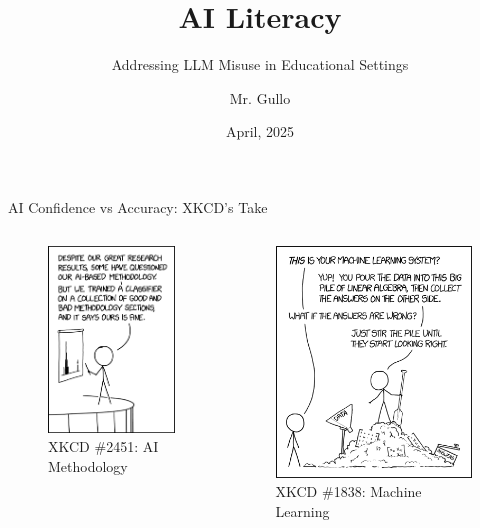 \documentclass{beamer}
\title[Critical AI Literacy]{AI Literacy}
\subtitle{Addressing LLM Misuse in Educational Settings}
\author[Mr. Gullo]{Mr. Gullo}
\date[April 2025]{April, 2025} %
\begin{document}
\begin{frame}
\titlepage
\end{frame}

\begin{frame}{AI Confidence vs Accuracy: XKCD's Take}
  \begin{columns}
    \begin{column}{0.48\textwidth}
     \begin{figure}
        \centering
        \includegraphics[width=0.6\linewidth]{cs12-ai-methodology.png}
     \caption*{XKCD \#2451: AI Methodology}
      \end{figure}
    \end{column}
    \begin{column}{0.48\textwidth}
      \begin{figure}
          \centering
          \includegraphics[width=0.8\linewidth]{cs12-ai-machine_learning.png}
                 \caption*{XKCD \#1838: Machine Learning}
      \end{figure}


\end{column}
\end{columns}
\end{frame}
\end{document}
